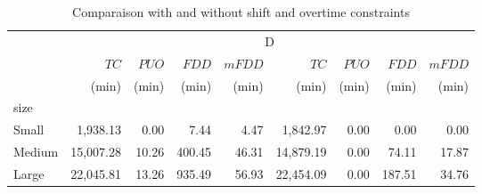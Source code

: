 \begin{table}[htb]
\centering
\caption{Comparaison with and without shift and overtime constraints}
\label{tab:lift_shift_constraints}
\begin{tabular}{lrrrrrrrr}
\toprule
 & \multicolumn{8}{c}{D} \\
 & $TC$ & $PUO$ & $FDD$ & $mFDD$ & $TC$ & $PUO$ & $FDD$ & $mFDD$ \\
 & (min) & (min) & (min) & (min) & (min) & (min) & (min) & (min) \\
size &  &  &  &  &  &  &  &  \\
\midrule
Small & 1,938.13 & 0.00 & 7.44 & 4.47 & 1,842.97 & 0.00 & 0.00 & 0.00 \\
Medium & 15,007.28 & 10.26 & 400.45 & 46.31 & 14,879.19 & 0.00 & 74.11 & 17.87 \\
Large & 22,045.81 & 13.26 & 935.49 & 56.93 & 22,454.09 & 0.00 & 187.51 & 34.76 \\
\bottomrule
\end{tabular}
\end{table}
